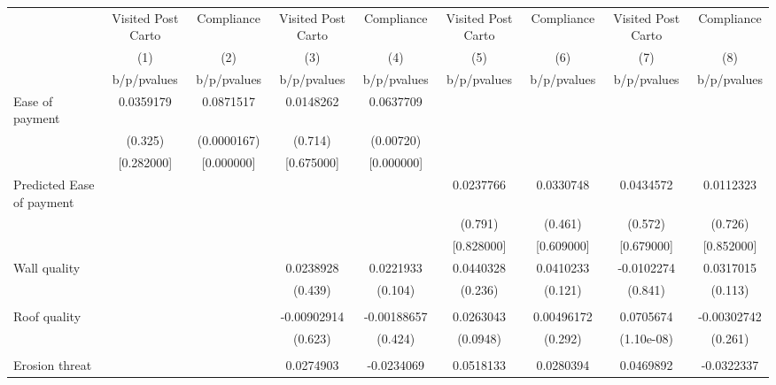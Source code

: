 {
\def\sym#1{\ifmmode^{#1}\else\(^{#1}\)\fi}
\begin{tabular}{l*{8}{c}}
\toprule
                &\multicolumn{1}{c}{Visited Post Carto}&\multicolumn{1}{c}{Compliance}&\multicolumn{1}{c}{Visited Post Carto}&\multicolumn{1}{c}{Compliance}&\multicolumn{1}{c}{Visited Post Carto}&\multicolumn{1}{c}{Compliance}&\multicolumn{1}{c}{Visited Post Carto}&\multicolumn{1}{c}{Compliance}\\
                &\multicolumn{1}{c}{(1)}&\multicolumn{1}{c}{(2)}&\multicolumn{1}{c}{(3)}&\multicolumn{1}{c}{(4)}&\multicolumn{1}{c}{(5)}&\multicolumn{1}{c}{(6)}&\multicolumn{1}{c}{(7)}&\multicolumn{1}{c}{(8)}\\
                &b/p/pvalues&b/p/pvalues&b/p/pvalues&b/p/pvalues&b/p/pvalues&b/p/pvalues&b/p/pvalues&b/p/pvalues\\
\midrule
Ease of payment &0.0359179&0.0871517&0.0148262&0.0637709&         &         &         &         \\
                &  (0.325)&(0.0000167)&  (0.714)&(0.00720)&         &         &         &         \\
                &[0.282000]&[0.000000]&[0.675000]&[0.000000]&         &         &         &         \\
Predicted Ease of payment&         &         &         &         &0.0237766&0.0330748&0.0434572&0.0112323\\
                &         &         &         &         &  (0.791)&  (0.461)&  (0.572)&  (0.726)\\
                &         &         &         &         &[0.828000]&[0.609000]&[0.679000]&[0.852000]\\
Wall quality    &         &         &0.0238928&0.0221933&0.0440328&0.0410233&-0.0102274&0.0317015\\
                &         &         &  (0.439)&  (0.104)&  (0.236)&  (0.121)&  (0.841)&  (0.113)\\
                &         &         &         &         &         &         &         &         \\
Roof quality    &         &         &-0.00902914&-0.00188657&0.0263043&0.00496172&0.0705674&-0.00302742\\
                &         &         &  (0.623)&  (0.424)& (0.0948)&  (0.292)&(1.10e-08)&  (0.261)\\
                &         &         &         &         &         &         &         &         \\
Erosion threat  &         &         &0.0274903&-0.0234069&0.0518133&0.0280394&0.0469892&-0.0322337\\

\end{tabular}}

